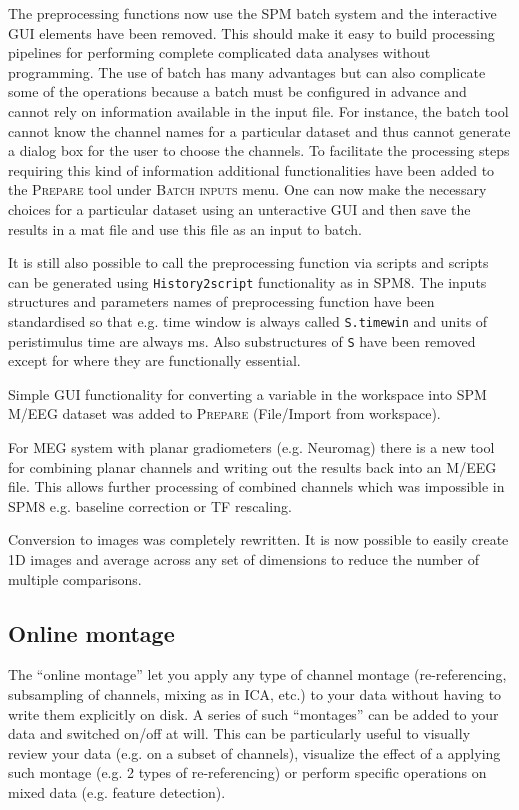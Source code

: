 \documentclass[a4paper,titlepage,openany]{article}
\begin{document}
\begin{multicols}{2}
The preprocessing functions now use the SPM batch system and the interactive GUI elements have been removed. This should make it easy to build processing pipelines for performing complete complicated data analyses without programming. The use of batch has many advantages but can also complicate some of the operations because a batch must be configured in advance and cannot rely on information available in the input file. For instance, the batch tool cannot know the channel names for a particular dataset and thus cannot generate a dialog box for the user to choose the channels. To facilitate the processing steps requiring this kind of information additional functionalities have been added to the \textsc{Prepare} tool under \textsc{Batch inputs} menu. One can now make the necessary choices for a particular dataset using an unteractive GUI and then save the results in a mat file and use this file as an input to batch.

It is still also possible to call the preprocessing function via scripts and scripts can be generated using \texttt{History2script} functionality as in SPM8. The inputs structures and parameters names of preprocessing function have been standardised so that e.g. time window is always called \texttt{S.timewin} and units of peristimulus time are always ms. Also substructures of \texttt{S} have been removed except for where they are functionally essential.

Simple GUI functionality for converting a variable in the workspace into SPM M/EEG dataset was added to \textsc{Prepare} (File/Import from workspace).

For MEG system with planar gradiometers (e.g. Neuromag) there is a new tool for combining planar channels and writing out the results back into an M/EEG file. This allows further processing of combined channels which was impossible in SPM8 e.g. baseline correction or TF rescaling.

Conversion to images was completely rewritten. It is now possible to easily create 1D images and average across any set of dimensions to reduce the number of multiple comparisons.

\subsection{Online montage}

The ``online montage'' let you apply any type of channel montage (re-referencing, subsampling of channels, mixing as in ICA, etc.) to your data without having to write them explicitly on disk. A series of such ``montages'' can be added to your data and switched on/off at will. This can be particularly useful to visually review your data (e.g. on a subset of channels), visualize the effect of a applying such montage (e.g. 2 types of re-referencing) or perform specific operations on mixed data (e.g. feature detection).


\end{multicols}
\end{document}
